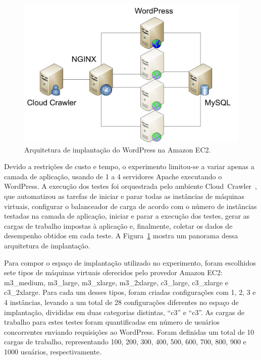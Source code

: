 \documentclass[12pt]{article}
\begin{document}

\begin{figure}[t]
  \begin{center}
    \includegraphics[scale=0.3]{img/ImplantacaoWordPress}
  \end{center}
  \caption{\label{fig:implantacao}Arquitetura de implantação do WordPress na Amazon EC2.}
\end{figure}

Devido a restrições de custo e tempo, o experimento limitou-se a variar 
apenas a camada de aplicação, usando de 1 a 4 servidores Apache executando o WordPress. 
A execução dos testes foi orquestrada pelo ambiente Cloud~Crawler~\cite{cunhacloud,cunha2013b},
que automatizou as tarefas de iniciar e parar todas as instâncias de máquinas virtuais, configurar 
o balanceador de carga de acordo com o número de instâncias testadas na camada de 
aplicação, iniciar e parar a execução dos testes, gerar as cargas de trabalho impostas à aplicação e, finalmente, coletar os dados de desempenho obtidos em cada teste. A Figura~\ref{fig:implantacao} mostra um panorama dessa arquitetura de implantação.

Para compor o espaço de implantação utilizado no experimento, 
foram escolhidos sete tipos de máquinas virtuais oferecidos pelo provedor Amazon EC2:
m3\_medium, m3\_large, m3\_xlarge, m3\_2xlarge, c3\_large, c3\_xlarge e
c3\_2xlarge. Para cada um desses tipos, foram criadas configurações
com 1, 2, 3 e 4 instâncias, levando a um total de 28 configurações diferentes no espaço de implantação,
divididas em duas categorias distintas, ``c3'' e ``c3''. As cargas de trabalho
para estes testes foram quantificadas em número de usuários concorrentes enviando
requisições ao WordPress. Foram definidas um total de 10 cargas de trabalho, representando
100, 200, 300, 400, 500, 600, 700, 800, 900 e 1000 usuários, respectivamente. 
\end{document}
